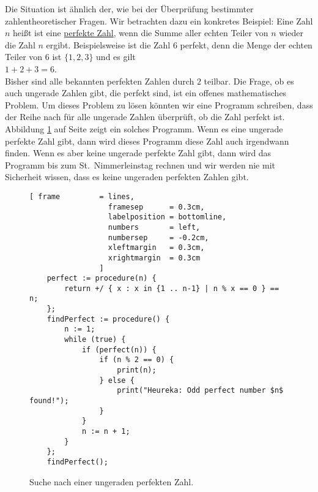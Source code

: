 Die Situation ist \"{a}hnlich der, wie bei der \"{U}berpr\"{u}fung bestimmter zahlentheoretischer
Fragen.  Wir betrachten dazu ein konkretes Beispiel: Eine Zahl $n$ hei\ss{}t 
ist eine \href{https://de.wikipedia.org/wiki/Vollkommene_Zahl}{perfekte Zahl},
wenn die Summe aller echten Teiler von $n$ wieder die Zahl $n$ ergibt.  Beispielsweise ist
die Zahl $6$ perfekt, denn die Menge der echten Teiler von $6$ ist $\{1,2,3\}$ und es gilt
\\[0.2cm]
\hspace*{1.3cm}
$1 + 2 + 3 = 6$.
\\[0.2cm]
Bisher sind alle bekannten perfekten Zahlen durch $2$ teilbar.  Die Frage, ob es auch
ungerade Zahlen gibt, die perfekt sind, ist ein offenes mathematisches Problem.  Um dieses
Problem zu l\"{o}sen k\"{o}nnten wir eine Programm schreiben, dass der Reihe nach f\"{u}r alle
ungerade Zahlen \"{u}berpr\"{u}ft, ob die Zahl perfekt ist.  Abbildung \ref{fig:find-perfect.stlx}
auf Seite \pageref{fig:find-perfect.stlx} zeigt ein solches Programm.  Wenn es eine ungerade perfekte Zahl
gibt, dann wird dieses Programm diese Zahl auch irgendwann finden.  Wenn es aber keine
ungerade perfekte Zahl gibt, dann wird das Programm bis zum St.~Nimmerleinstag rechnen und
wir werden nie mit Sicherheit wissen, dass es keine ungeraden perfekten Zahlen gibt.

\begin{figure}[!ht]
  \centering
\begin{Verbatim}[ frame         = lines, 
                  framesep      = 0.3cm, 
                  labelposition = bottomline,
                  numbers       = left,
                  numbersep     = -0.2cm,
                  xleftmargin   = 0.3cm,
                  xrightmargin  = 0.3cm
                ]
    perfect := procedure(n) {
        return +/ { x : x in {1 .. n-1} | n % x == 0 } == n;
    };    
    findPerfect := procedure() {
        n := 1;
        while (true) {
            if (perfect(n)) {
                if (n % 2 == 0) {
                    print(n);
                } else {
                    print("Heureka: Odd perfect number $n$ found!");
                }
            } 
            n := n + 1;
        }
    };
    findPerfect();
\end{Verbatim}
\vspace*{-0.3cm}
  \caption{Suche nach einer ungeraden perfekten Zahl.}
  \label{fig:find-perfect.stlx}
\end{figure} 

